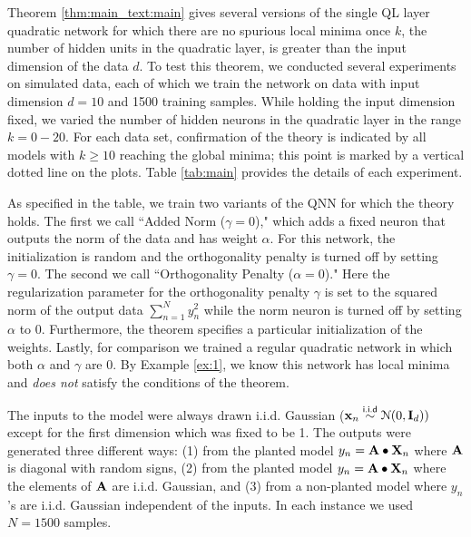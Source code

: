 \documentclass[11pt]{article}
\theoremstyle{plain}
\theoremstyle{plain}
\numberwithin{equation}{section}
\numberwithin{lemma}{section}
\numberwithin{theorem}{section}
\numberwithin{corollary}{section}
\numberwithin{observation}{section}
\numberwithin{definition}{section}
\numberwithin{example}{section}
\begin{document}
Theorem \ref{thm:main_text:main} gives several versions of the single QL layer quadratic network for which there are no spurious local minima once $k$, the number of hidden units in the quadratic layer, is greater than the input dimension of the data $d$. To test this theorem, we conducted several experiments on simulated data, each of which we train the network on data with input dimension $d = 10$ and 1500 training samples. While holding the input dimension fixed, we varied the number of hidden neurons in the quadratic layer in the range $k = 0-20$.  For each data set, confirmation of the theory is indicated by all models with $k \geq 10$ reaching the global minima; this point is marked by a vertical dotted line on the plots. Table \ref{tab:main} provides the details of each experiment.

As specified in the table, we train two variants of the QNN for which the theory holds. The first we call ``Added Norm ($\gamma = 0$)," which adds a fixed neuron that outputs the norm of the data and has weight $\alpha$.  For this network, the initialization is random and the orthogonality penalty is turned off by setting $\gamma = 0$.  The second we call ``Orthogonality Penalty ($\alpha = 0$)."  Here the regularization parameter for the orthogonality penalty $\gamma$ is set to the squared norm of the output data $\sum_{n=1}^N y_n^2$ while the norm neuron is turned off by setting $\alpha$ to 0.  Furthermore, the theorem specifies a particular initialization of the weights.  Lastly, for comparison we trained a regular quadratic network in which both $\alpha$ and $\gamma$ are 0.  By Example \ref{ex:1}, we know this network has local minima and \textit{does not} satisfy the conditions of the theorem.

The inputs to the model were always drawn i.i.d. Gaussian ($\V{x}_n \overset{\text{\sf i.i.d}}{\sim} \mathcal{N}(0, \Mx{I}_d))$ except for the first dimension which was fixed to be 1. The outputs were generated three different ways: (1) from the planted model $y_n = \Mx{A}\bullet \Mx{X}_n$ where $\Mx{A}$ is diagonal with random signs, (2) from the planted model $y_n = \Mx{A}\bullet \Mx{X}_n$ where the elements of $\Mx{A}$ are i.i.d. Gaussian, and (3) from a non-planted model where $y_n$'s are i.i.d. Gaussian independent of the inputs.  In each instance we used $N = 1500$ samples. 
\end{document}
